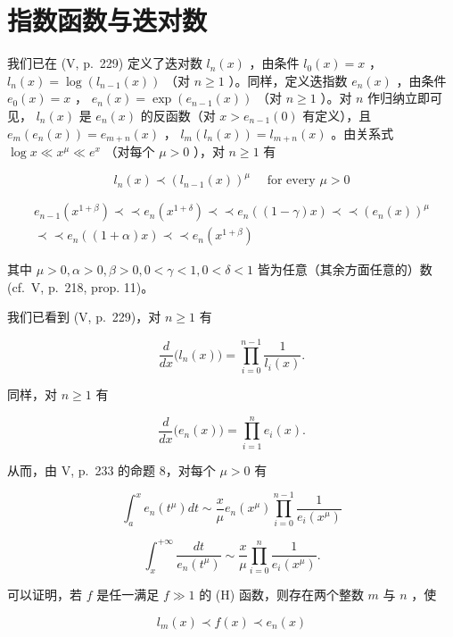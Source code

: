 \section{指数函数与迭对数}

我们已在 (V, p.~229) 定义了迭对数 \(l_n(x)\) ，由条件 \(l_0(x) = x\) ， \(l_n(x) = \log(l_{n-1}(x))\) （对 \(n \geqslant 1\) ）。同样，定义迭指数 \(e_n(x)\) ，由条件 \(e_0(x) = x\) ， \(e_n(x) = \exp(e_{n-1}(x))\) （对 \(n \geqslant 1\) ）。对 \(n\) 作归纳立即可见， \(l_n(x)\) 是 \(e_n(x)\) 的反函数（对 \(x > e_{n-1}(0)\) 有定义），且 \(e_m(e_n(x)) = e_{m+n}(x)\) ， \(l_m(l_n(x)) = l_{m+n}(x)\) 。由关系式 \(\log x \ll x^\mu \ll e^x\) （对每个 \(\mu > 0\) ），对 \(n \geqslant 1\) 有

\[
l _ {n} (x) \prec (l _ {n - 1} (x)) ^ {\mu} \quad \text {   for   every   } \mu > 0\tag{5}
\]

\[
\begin{array}{c} e _ {n - 1} (x ^ {1 + \beta}) \prec \prec e _ {n} (x ^ {1 + \delta}) \prec \prec e _ {n} ((1 - \gamma) x) \prec \prec (e _ {n} (x)) ^ {\mu} \\ \prec \prec e _ {n} ((1 + \alpha) x) \prec \prec e _ {n} (x ^ {1 + \beta}) \end{array}\tag{6}
\]

其中 \(\mu > 0, \alpha > 0, \beta > 0, 0 < \gamma < 1, 0 < \delta < 1\) 皆为任意（其余方面任意的）数 (cf.~V, p.~218, prop. 11)。

我们已看到 (V, p.~229)，对 \(n \geqslant 1\) 有

\[
{\frac {d}{d x}} \big (l _ {n} (x) \big) = \prod_ {i = 0} ^ {n - 1} {\frac {1}{l _ {i} (x)}}.\tag{7}
\]

同样，对 \(n\geqslant 1\) 有

\[
\frac {d}{d x} \big (e _ {n} (x) \big) = \prod_ {i = 1} ^ {n} e _ {i} (x).\tag{8}
\]

从而，由 V, p.~233 的命题 8，对每个 \(\mu > 0\) 有

\[
\int_ {a} ^ {x} e _ {n} (t ^ {\mu}) d t \sim \frac {x}{\mu} e _ {n} (x ^ {\mu}) \prod_ {i = 0} ^ {n - 1} \frac {1}{e _ {i} (x ^ {\mu})}\tag{9}
\]

\[
\int_ {x} ^ {+ \infty} \frac {d t}{e _ {n} (t ^ {\mu})} \sim \frac {x}{\mu} \prod_ {i = 0} ^ {n} \frac {1}{e _ {i} (x ^ {\mu})}.\tag{10}
\]

可以证明，若 \(f\) 是任一满足 \(f \gg 1\) 的 (H) 函数，则存在两个整数 \(m\) 与 \(n\) ，使

\[
l _ {m} (x) \prec f (x) \prec e _ {n} (x)
\]

